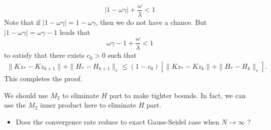 \begin{itemize}
\begin{equation} 
|1 - \omega\gamma| + \frac{\omega}{\lambda} < 1 
\end{equation} 
Note that if $|1 - \omega\gamma| = 1 - \omega\gamma$, then we do not have a chance. But $|1 - \omega\gamma| = \omega\gamma - 1$ leads that 
\begin{equation}
\omega \gamma - 1 + \frac{\omega}{\lambda} < 1 
\end{equation}
to satisfy that there exists $c_0 > 0$ such that
\begin{eqnarray*}
\|Kz_* - Kz_{k+1}\| + \|H_* - H_{k+1}\|_r \leq (1 - c_0) \left [ \|Kz_* - Kz_k\| + \|H_* - H_k\|_r \right ]. 
\end{eqnarray*}
This completes the proof. 
\begin{remark}
We should use $M_2$ to eliminate $H$ part to make tighter bounds. In fact, we can use the $M_2$ inner product here to eliminate $H$ part.  
\end{remark}

\begin{itemize}
\item Does the convergence rate reduce to exact Gauss-Seidel case when $N\rightarrow \infty$ ? 
\end{itemize}





%

\end{itemize}
